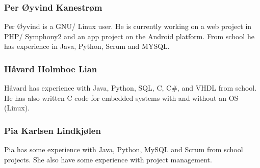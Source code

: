 \subsubsection{Per Øyvind Kanestrøm}
Per Øyvind is a GNU/ Linux user. He is currently working on a web project in PHP/ Symphony2 and an app project on the Android platform. From school he has experience in Java, Python, Scrum and MYSQL.

\subsubsection{Håvard	Holmboe	Lian}
Håvard has experience with Java, Python, SQL, C, C\#, and VHDL from school. He has also written C code for embedded systems with and without an OS (Linux). 

\subsubsection{Pia	Karlsen	Lindkjølen}
Pia has some experience with Java, Python, MySQL and Scrum from school projects. She also have some experience with project management. 
